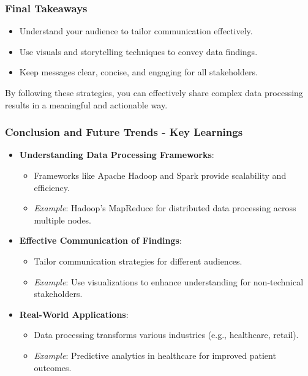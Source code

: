 \documentclass[aspectratio=169]{beamer}
\begin{document}
\begin{frame}[fragile]
    \frametitle{Final Takeaways}
    \begin{itemize}
        \item Understand your audience to tailor communication effectively.
        \item Use visuals and storytelling techniques to convey data findings.
        \item Keep messages clear, concise, and engaging for all stakeholders.
    \end{itemize}
    
    By following these strategies, you can effectively share complex data processing results in a meaningful and actionable way.
\end{frame}

\begin{frame}[fragile]
    \frametitle{Conclusion and Future Trends - Key Learnings}
    \begin{itemize}
        \item \textbf{Understanding Data Processing Frameworks}:
        \begin{itemize}
            \item Frameworks like Apache Hadoop and Spark provide scalability and efficiency.
            \item \textit{Example}: Hadoop's MapReduce for distributed data processing across multiple nodes.
        \end{itemize}
        
        \item \textbf{Effective Communication of Findings}:
        \begin{itemize}
            \item Tailor communication strategies for different audiences.
            \item \textit{Example}: Use visualizations to enhance understanding for non-technical stakeholders.
        \end{itemize}
        
        \item \textbf{Real-World Applications}:
        \begin{itemize}
            \item Data processing transforms various industries (e.g., healthcare, retail).
            \item \textit{Example}: Predictive analytics in healthcare for improved patient outcomes.
        \end{itemize}
    \end{itemize}
\end{frame}
\end{document}
